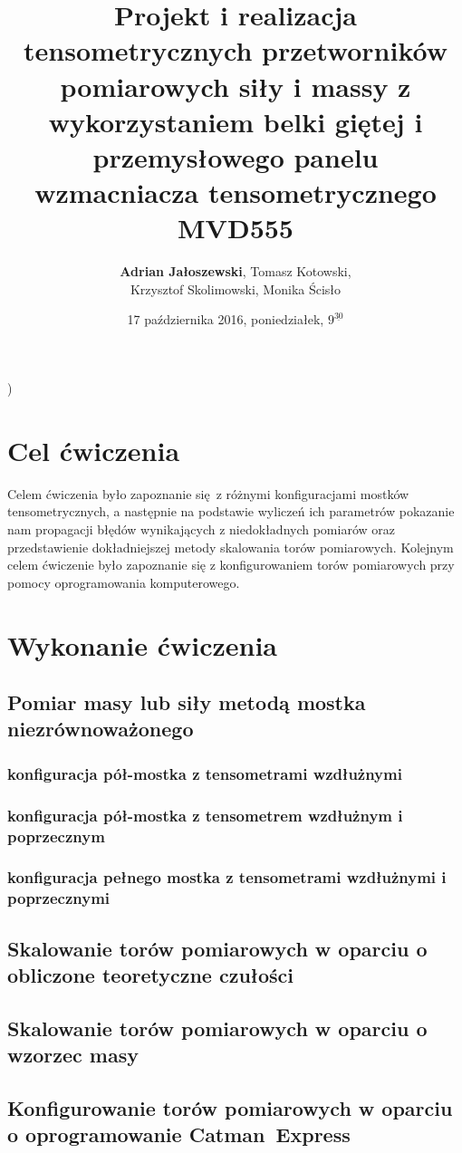 \documentclass[a4paper, 12pt, titlepage]{article}
\title{Projekt i realizacja tensometrycznych przetworników pomiarowych siły i massy z wykorzystaniem belki giętej i przemysłowego panelu wzmacniacza tensometrycznego MVD555}
\author{\textbf{Adrian Jałoszewski}, Tomasz Kotowski,\\Krzysztof Skolimowski, Monika Ścisło}
\date{17 października 2016, poniedziałek, $9^{\underline{30}}$}
\begin{document}
\right) 
	\maketitle
	\tableofcontents
	\newpage
	\section{Cel ćwiczenia}
		Celem ćwiczenia było zapoznanie się z różnymi konfiguracjami mostków tensometrycznych, a następnie na podstawie wyliczeń ich parametrów pokazanie nam propagacji błędów wynikających z niedokładnych pomiarów oraz przedstawienie dokładniejszej metody skalowania torów pomiarowych. Kolejnym celem ćwiczenie było zapoznanie się z konfigurowaniem torów pomiarowych przy pomocy oprogramowania komputerowego.
	\section{Wykonanie ćwiczenia}
		\subsection{Pomiar masy lub siły metodą mostka niezrównoważonego}
			\subsubsection{konfiguracja pół-mostka z tensometrami wzdłużnymi}
			\subsubsection{konfiguracja pół-mostka z tensometrem wzdłużnym i poprzecznym}
			\subsubsection{konfiguracja pełnego mostka z tensometrami wzdłużnymi i poprzecznymi}
		\subsection{Skalowanie torów pomiarowych w oparciu o obliczone teoretyczne czułości}
		\subsection{Skalowanie torów pomiarowych w oparciu o wzorzec masy}
		\subsection{Konfigurowanie torów pomiarowych w oparciu o oprogramowanie Catman\textregistered\ Express}
\end{document}
